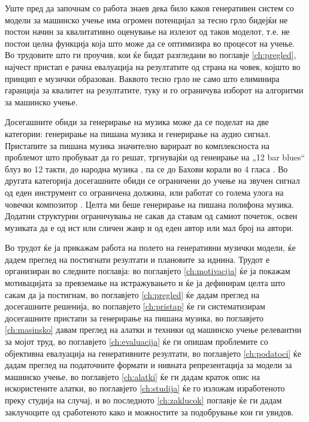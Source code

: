 Уште пред да започнам со работа знаев дека било каков генеративен систем со модели за машинско учење има огромен потенцијал за тесно грло бидејќи не постои начин за квалитативно оценување на излезот од таков моделот, т.е. не постои целна функција која што може да се оптимизира во процесот на учење. Во трудовите што ги проучив, кои ќе бидат разгледани во поглавје \ref{ch:pregled}, најчест пристап е рачна евалуација на резултатите од страна на човек, којшто во принцип е музички образован. Ваквото тесно грло не само што елиминира гаранција за квалитет на резултатите, туку и го ограничува изборот на алгоритми за машинско учење. 

Досегашните обиди за генерирање на музика може да се поделат на две категории: генерирање на пишана музика и генерирање на аудио сигнал. Пристапите за пишана музика значително варираат во комплексноста на проблемот што пробуваат да го решат, тргнувајќи од генеирање на „12 bar blues“ \cite{Eck2002} блуз во 12 такти, до народна музика \cite{Sturm2016}, па се до Бахови корали во 4 гласа \cite{Liang2017,Hadjeres2016}. Во другата категорија досегашните обиди \cite{Oord2016} се ограничени до учење на звучен сигнал од еден инструмент со ограничена должина, или работат со голема улога на човечки композитор \cite{Ghedini2015}. Целта ми беше генерирање на пишана полифона музика. Додатни структурни ограничувања не сакав да ставам од самиот почеток, освен музиката да е од ист или сличен жанр и од еден автор или мал број на автори.

Во трудот ќе ја прикажам работа на полето на генеративни музички модели, ќе дадем преглед на постигнати резултати и плановите за иднина. Трудот е организиран во следните поглавја: во поглавјето \ref{ch:motivacija} ќе ја покажам мотивацијата за превземање на истражувањето и ќе ја дефинирам целта што сакам да ја постигнам, во поглавјето \ref{ch:pregled} ќе дадам преглед на досегашните решенија, во поглавјето \ref{ch:pristap} ќе ги систематизирам досегашните пристапи за генерирање на пишана музика, во поглавјето \ref{ch:masinsko} давам преглед на алатки и техники од машинско учење релевантни за мојот труд, во поглавјето \ref{ch:evaluacija} ќе ги опишам проблемите со објективна евалуација на генеративните резултати, во поглавјето \ref{ch:podatoci} ќе дадам преглед на податочните формати и нивната репрезентација за модели за машинско учење, во поглавјето \ref{ch:alatki} ќе ги дадам краток опис на искористените алатки, во поглавјето \ref{ch:studija} ќе го изложам изработеното преку студија на случај, и во последното \ref{ch:zaklucok} поглавје ќе ги дадам заклучоците од сработеното како и можностите за подобрување кои ги увидов.

